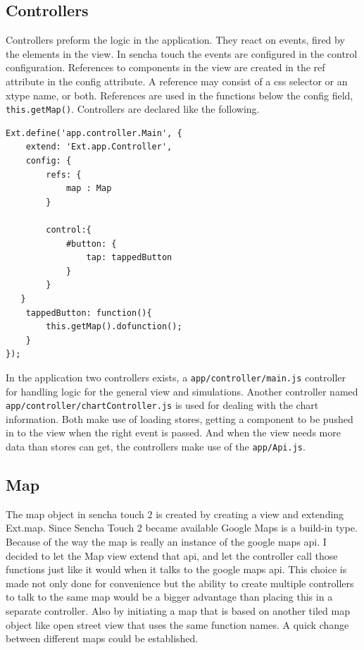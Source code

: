 \subsection{Controllers}
Controllers preform the logic in the application. They react on events, fired by the elements in the view. In sencha touch the events are configured in the control configuration. References to components in the view are created in the ref attribute in the config attribute. A reference may consist of a css selector or an xtype name, or both. References are used in the functions below the config field, \texttt{this.getMap()}. Controllers are declared like the following.
\begin{lstlisting}
Ext.define('app.controller.Main', {
	extend: 'Ext.app.Controller',
	config: {
		refs: {  
			map : Map      
		}
		
		control:{
			#button: {
				tap: tappedButton
			}
		}        
   }   
	tappedButton: function(){
		this.getMap().dofunction();
	}
});
\end{lstlisting}
In the application two controllers exists, a \texttt{app/controller/main.js} controller for handling logic for the general view and simulations. Another controller named \\
\texttt{app/controller/chartController.js} is used for dealing with the chart information. Both make use of loading stores, getting a component to be pushed in to the view when the right event is passed. And when the view needs more data than stores can get, the controllers make use of the \texttt{app/Api.js}. 

\subsection{Map}
The map object in sencha touch 2 is created by creating a view and extending Ext.map. Since Sencha Touch 2 became available Google Maps is a build-in type. Because of the way the map is really an instance of the google maps api. I decided to let the Map view extend that api, and let the controller call those functions just like it would when it talks to the google maps api. This choice is made not only done for convenience but the ability to create multiple controllers to talk to the same map would be a bigger advantage than placing this in a separate controller. Also by initiating a map that is based on another tiled map object like open street view that uses the same function names. A quick change between different maps could be established. 


